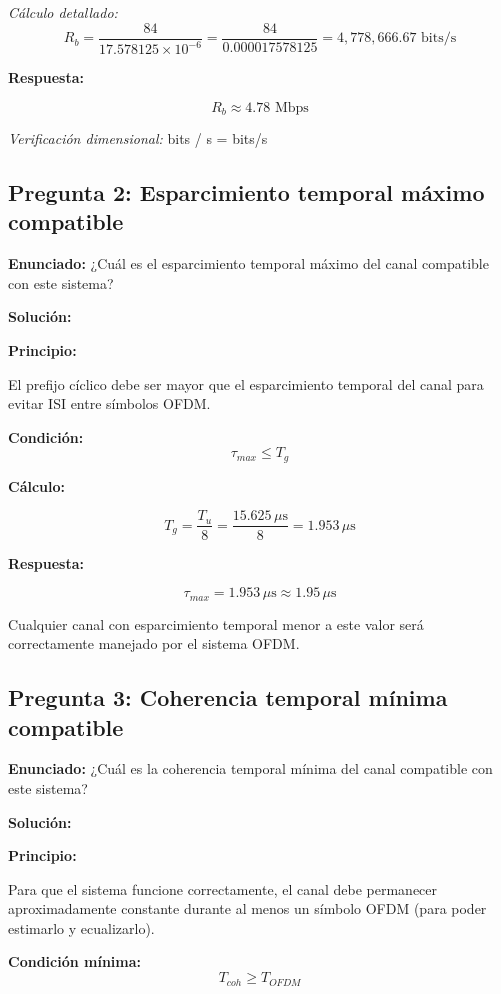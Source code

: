 \documentclass[11pt,a4paper]{article}
\begin{document}
\textit{C\'alculo detallado:}
\[
R_b = \frac{84}{17.578125 \times 10^{-6}} = \frac{84}{0.000017578125} = 4{,}778{,}666.67 \text{ bits/s}
\]

\textbf{Respuesta:}

\[
\boxed{R_b \approx 4.78 \text{ Mbps}}
\]

\textit{Verificaci\'on dimensional:} bits / s = bits/s \checkmark

\subsection*{Pregunta 2: Esparcimiento temporal m\'aximo compatible}

\textbf{Enunciado:} ¿Cu\'al es el esparcimiento temporal m\'aximo del canal compatible con este sistema?

\vspace{0.3cm}
\textbf{Soluci\'on:}

\textbf{Principio:}

El prefijo c\'iclico debe ser mayor que el esparcimiento temporal del canal para evitar ISI entre s\'imbolos OFDM.

\textbf{Condici\'on:}
\[
\tau_{max} \leq T_g
\]

\textbf{C\'alculo:}

\[
T_g = \frac{T_u}{8} = \frac{15.625 \, \mu\text{s}}{8} = 1.953 \, \mu\text{s}
\]

\textbf{Respuesta:}

\[
\boxed{\tau_{max} = 1.953 \, \mu\text{s} \approx 1.95 \, \mu\text{s}}
\]

Cualquier canal con esparcimiento temporal menor a este valor ser\'a correctamente manejado por el sistema OFDM.

\subsection*{Pregunta 3: Coherencia temporal m\'inima compatible}

\textbf{Enunciado:} ¿Cu\'al es la coherencia temporal m\'inima del canal compatible con este sistema?

\vspace{0.3cm}
\textbf{Soluci\'on:}

\textbf{Principio:}

Para que el sistema funcione correctamente, el canal debe permanecer aproximadamente constante durante al menos un s\'imbolo OFDM (para poder estimarlo y ecualizarlo).

\textbf{Condici\'on m\'inima:}
\[
T_{coh} \geq T_{OFDM}
\]
\end{document}
